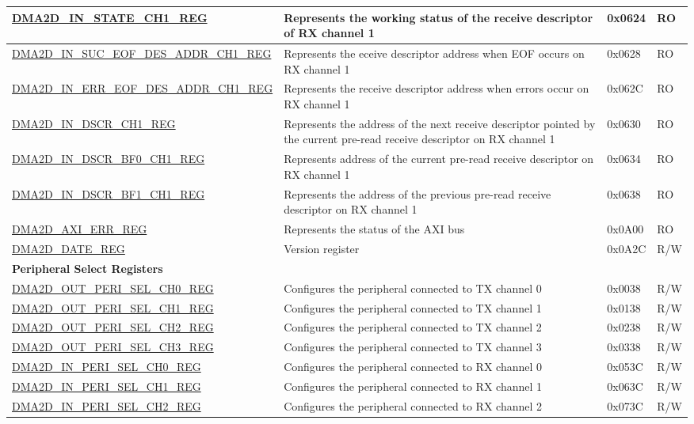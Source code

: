 \begin{longtable}{ | p{7cm} | p{11.5cm} | p{1.3cm} | p{2cm} | }
\hyperref[regdesc:DMA2DINSTATECHNREG]{DMA2D\_IN\_STATE\_CH1\_REG} & Represents the working status of the receive descriptor of RX channel 1 & 0x0624 & RO \\ \hline
\hyperref[regdesc:DMA2DINSUCEOFDESADDRCHNREG]{DMA2D\_IN\_SUC\_EOF\_DES\_ADDR\_CH1\_REG} & Represents the eceive descriptor address when EOF occurs on RX channel 1 & 0x0628 & RO \\ \hline
\hyperref[regdesc:DMA2DINERREOFDESADDRCHNREG]{DMA2D\_IN\_ERR\_EOF\_DES\_ADDR\_CH1\_REG} & Represents the receive descriptor address when errors occur on RX channel 1 & 0x062C & RO \\ \hline
\hyperref[regdesc:DMA2DINDSCRCHNREG]{DMA2D\_IN\_DSCR\_CH1\_REG} & Represents the address of the next receive descriptor pointed by the current pre-read receive descriptor on RX channel 1 & 0x0630 & RO \\ \hline
\hyperref[regdesc:DMA2DINDSCRBF0CHNREG]{DMA2D\_IN\_DSCR\_BF0\_CH1\_REG} & Represents address of the current pre-read receive descriptor on RX channel 1 & 0x0634 & RO \\ \hline
\hyperref[regdesc:DMA2DINDSCRBF1CHNREG]{DMA2D\_IN\_DSCR\_BF1\_CH1\_REG} & Represents the address of the previous pre-read receive descriptor on RX channel 1 & 0x0638 & RO \\ \hline
\hyperref[regdesc:DMA2DAXIERRREG]{DMA2D\_AXI\_ERR\_REG} & Represents the status of the AXI bus & 0x0A00 & RO \\ \hline
\hyperref[regdesc:DMA2DDATEREG]{DMA2D\_DATE\_REG} & Version register & 0x0A2C & R/W \\ \hline
\multicolumn{4}{|l|}{\textbf{Peripheral Select Registers}} \\ \hline
\hyperref[regdesc:DMA2DOUTPERISELCHNREG]{DMA2D\_OUT\_PERI\_SEL\_CH0\_REG} & Configures the peripheral connected to TX channel 0 & 0x0038 & R/W \\ \hline
\hyperref[regdesc:DMA2DOUTPERISELCHNREG]{DMA2D\_OUT\_PERI\_SEL\_CH1\_REG} & Configures the peripheral connected to TX channel 1 & 0x0138 & R/W \\ \hline
\hyperref[regdesc:DMA2DOUTPERISELCHNREG]{DMA2D\_OUT\_PERI\_SEL\_CH2\_REG} & Configures the peripheral connected to TX channel 2 & 0x0238 & R/W \\ \hline
\hyperref[regdesc:DMA2DOUTPERISELCHNREG]{DMA2D\_OUT\_PERI\_SEL\_CH3\_REG} & Configures the peripheral connected to TX channel 3 & 0x0338 & R/W \\ \hline
\hyperref[regdesc:DMA2DINPERISELCHNREG]{DMA2D\_IN\_PERI\_SEL\_CH0\_REG} & Configures the peripheral connected to RX channel 0 & 0x053C & R/W \\ \hline
\hyperref[regdesc:DMA2DINPERISELCHNREG]{DMA2D\_IN\_PERI\_SEL\_CH1\_REG} & Configures the peripheral connected to RX channel 1 & 0x063C & R/W \\ \hline
\hyperref[regdesc:DMA2DINPERISELCHNREG]{DMA2D\_IN\_PERI\_SEL\_CH2\_REG} & Configures the peripheral connected to RX channel 2 & 0x073C & R/W \\ \hline
\end{longtable}
